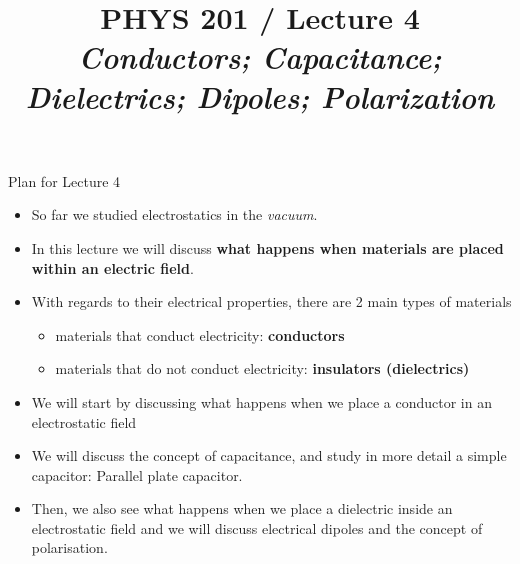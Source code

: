 \renewcommand{\prevlecture}{3 }
\renewcommand{\thislecture}{4 }
\renewcommand{\nextlecture}{5 }

%
%

\title[PHYS 201 / Lecture \thislecture]
{
  PHYS 201 / Lecture \thislecture\\
  {\it Conductors; Capacitance; Dielectrics; Dipoles; Polarization}\\
}



\begin{frame}[plain]
  \titlepage
\end{frame}


%
%

\renewcommand{\lecturesummarytitle}{Revision }


%
%

\begin{frame}{Plan for Lecture \thislecture}

\begin{itemize}
  \item So far we studied electrostatics in the {\em vacuum}.
  \item In this lecture we will discuss {\bf what happens when materials are placed within an electric field}.

  \item With regards to their electrical properties, there are 2 main types of materials
   \begin{itemize}
     \item materials that conduct electricity: {\bf conductors}
     \item materials that do not conduct electricity: {\bf insulators (dielectrics)}
   \end{itemize}

   \item We will start by discussing what happens when we place a conductor in an electrostatic field

   \item We will discuss the concept of capacitance, and
         study in more detail a simple capacitor: Parallel plate capacitor.

   \item Then, we also see what happens when we place a dielectric inside an electrostatic field
         and we will discuss electrical dipoles and the concept of polarisation.
\end{itemize}
\end{frame}

